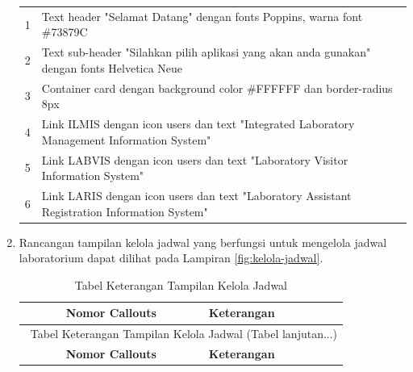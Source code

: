 \begin{enumerate}
{\begin{longtable}{c p{}}
			      1                       & Text header "Selamat Datang" dengan fonts Poppins, warna font \#73879C                       \\
			      2                       & Text sub-header "Silahkan pilih aplikasi yang akan anda gunakan" dengan fonts Helvetica Neue \\
			      3                       & Container card dengan background color \#FFFFFF dan border-radius 8px                        \\
			      4                       & Link ILMIS dengan icon users dan text "Integrated Laboratory Management Information System"  \\
			      5                       & Link LABVIS dengan icon users dan text "Laboratory Visitor Information System"               \\
			      6                       & Link LARIS dengan icon users dan text "Laboratory Assistant Registration Information System" \\
			      \hline
		      \end{longtable}
	      }

	\item Rancangan tampilan kelola jadwal yang berfungsi untuk mengelola jadwal laboratorium dapat dilihat pada Lampiran \ref{fig:kelola-jadwal}. \selectfont


	      {
		      \selectfont
		      \begin{longtable}{c p{}}
			      \caption{Tabel Keterangan Tampilan Kelola Jadwal}
			      \label{tab:ui-jadwal}                                                                                           \\
			      \hline
			      \textbf{Nomor Callouts} & \textbf{Keterangan}                                                                   \\
			      \hline
			      \endfirsthead

			      \multicolumn{2}{c}{\selectfont \thetable\ {Tabel Keterangan Tampilan Kelola Jadwal} \space (Tabel lanjutan...)} \\
			      \hline
			      \textbf{Nomor Callouts} & \textbf{Keterangan}                                                                   \\
			      \hline
			      \endhead


\end{longtable}}
\end{enumerate}
